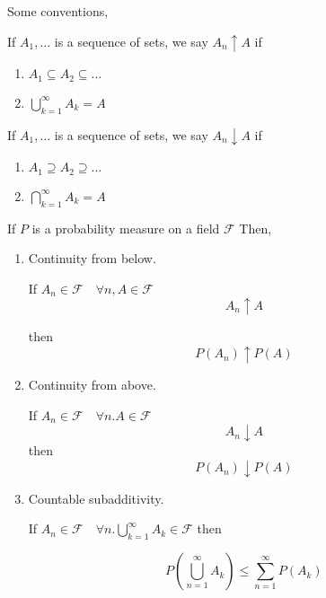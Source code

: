 \documentclass[11pt,fleqn]{book} %
\begin{document}
Some conventions, 

If $A_1, \dots$ is a sequence of sets, we say $A_n \uparrow A$ if 

\begin{enumerate}
 	\item $A_1 \subseteq A_2 \subseteq \dots$
 	\item $\displaystyle \bigcup^\infty_{k=1} A_k = A$
 \end{enumerate} 
\vspace{5mm}
 If $A_1, \dots$ is a sequence of sets, we say $A_n \downarrow A$ if 

\begin{enumerate}
 	\item $A_1 \supseteq A_2 \supseteq \dots$
 	\item $\displaystyle \bigcap^\infty_{k=1} A_k = A$
 \end{enumerate} 

 \begin{theorem}
 	If $P$ is a probability measure on a field $\mathcal{F}$ Then, 

 	\begin{enumerate}
 		\item Continuity from below.

 		If $A_n \in \mathcal{F} \quad \forall n, A \in \mathcal{F}$
 		$$ A_n \uparrow A$$

 		then $$P(A_n) \uparrow P(A)$$

 		\item Continuity from above.

 		If $A_n \in \mathcal{F} \quad \forall n. A \in \mathcal{F}$  
 			$$A_n \downarrow A$$
 		 then $$P(A_n) \downarrow P(A)$$

 		\item Countable subadditivity.

 		If $A_n \in \mathcal{F} \quad \forall n. \displaystyle \bigcup^\infty_{k=1} A_k \in \mathcal{F}$ then 

 		$$P(\displaystyle \bigcup^\infty_{n=1} A_k) \leq \displaystyle \sum^\infty_{n=1} P(A_k)$$
 	\end{enumerate}
 \end{theorem}
\end{document}
